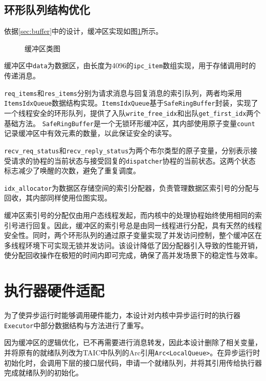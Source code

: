 \subsection{环形队列结构优化}

依据\ref{sec:buffer}中的设计，缓冲区实现如图\ref{缓冲区类图}所示。

\begin{figure}[htbp]
  \centering
  
  \caption{缓冲区类图}\label{缓冲区类图}
\end{figure}

缓冲区中\texttt{data}为数据区，由长度为4096的\texttt{ipc\_item}数组实现，用于存储调用时的传递消息。

\texttt{req\_items}和\texttt{res\_items}分别为请求消息与回复消息的索引队列，两者均采用\texttt{ItemsIdxQueue}数据结构实现。\texttt{ItemsIdxQueue}基于\texttt{SafeRingBuffer}封装，实现了一个线程安全的环形队列，提供了入队\texttt{write\_free\_idx}和出队\texttt{get\_first\_idx}两个基础方法。
\texttt{SafeRingBuffer}是一个无锁环形缓冲区，其内部使用原子变量\texttt{count}记录缓冲区中有效元素的数量，以此保证安全的读写。

\texttt{recv\_req\_status}和\texttt{recv\_reply\_status}为两个布尔类型的原子变量，分别表示接受请求的协程的当前状态与接受回复的\texttt{dispatcher}协程的当前状态。这两个状态标志减少了唤醒的次数，避免了重复调度。

\texttt{idx\_allocator}为数据区存储空间的索引分配器，负责管理数据区索引号的分配与回收，其内部同样使用位图实现。

缓冲区索引号的分配仅由用户态线程发起，而内核中的处理协程始终使用相同的索引号进行回复。因此，缓冲区的索引号总是由同一线程进行分配，具有天然的线程安全性。同时，两个环形队列的通过原子变量实现了并发访问控制，整个缓冲区在多线程环境下可实现无锁并发访问。该设计降低了因分配器引入导致的性能开销，使分配回收操作在极短的时间内即可完成，确保了高并发场景下的稳定性与效率。

\section{执行器硬件适配}

为了使异步运行时能够调用硬件能力，本设计对内核中异步运行时的执行器\texttt{Executor}中部分数据结构与方法进行了重写。

因为缓冲区的逻辑优化，已不再需要进行消息转发，因此本设计删除了相关变量，并将原有的就绪队列改为TAIC中队列的Arc引用\texttt{Arc<LocalQueue>}。在异步运行时初始化时，会调用下层的接口层代码，申请一个就绪队列，并将其引用传给执行器完成就绪队列的初始化。

